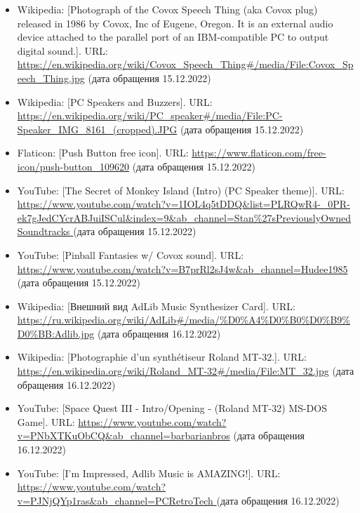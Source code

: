 \documentclass[a4paper,12pt]{extarticle}
\begin{document}
\begin{enumerate}[label=\textbf{\arabic*}]
\begin{itemize}
            \item Wikipedia: [Photograph of the Covox Speech Thing (aka Covox plug) released in 1986 by Covox, Inc of Eugene, Oregon. It is an external audio device attached to the parallel port of an IBM-compatible PC to output digital sound.]. URL: \url{https://en.wikipedia.org/wiki/Covox_Speech_Thing#/media/File:Covox_Speech_Thing.jpg} (дата обращения 15.12.2022)
            \item Wikipedia: [PC Speakers and Buzzers]. URL: \url{https://en.wikipedia.org/wiki/PC_speaker#/media/File:PC-Speaker_IMG_8161_(cropped).JPG} (дата обращения 15.12.2022)
            \item Flaticon: [Push Button free icon]. URL: \url{https://www.flaticon.com/free-icon/push-button_109620} (дата обращения 15.12.2022)
            \item YouTube: [The Secret of Monkey Island (Intro) (PC Speaker theme)]. URL: \url{https://www.youtube.com/watch?v=1IOL4q5tDDQ&list=PLRQwR4-_0PR-ek7gJedCYcrABJuiISCul&index=9&ab_channel=Stan%
			} (дата обращения 15.12.2022)
            \item YouTube: [Pinball Fantasies w/ Covox sound]. URL: \url{https://www.youtube.com/watch?v=B7prRl2sJ4w&ab_channel=Hudee1985
			} (дата обращения 15.12.2022)

            \item Wikipedia: [Внешний вид AdLib Music Synthesizer Card]. URL: \url{https://ru.wikipedia.org/wiki/AdLib#/media/%D0%A4%D0%B0%D0%B9%D0%BB:Adlib.jpg} (дата обращения 16.12.2022)
            \item Wikipedia: [Photographie d'un synthétiseur Roland MT-32.]. URL: \url{https://en.wikipedia.org/wiki/Roland_MT-32#/media/File:MT_32.jpg} (дата обращения 16.12.2022)
            \item YouTube: [Space Quest III - Intro/Opening - (Roland MT-32) MS-DOS Game]. URL: \url{https://www.youtube.com/watch?v=PNbXTKuObCQ&ab_channel=barbarianbros} (дата обращения 16.12.2022)
            \item YouTube: [I'm Impressed, Adlib Music is AMAZING!]. URL: \url{https://www.youtube.com/watch?v=PJNjQYp1ras&ab_channel=PCRetroTech
		} (дата обращения 16.12.2022)


\end{itemize}
\end{enumerate}
\end{document}
